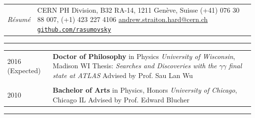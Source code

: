 \documentclass{letter}
\begin{document}
 


\begin{tabular}{p{}p{}}
	\hfill \newline \href{https://ch.linkedin.com/in/andrew-hard-25b690a5}{\Huge{\color{Maroon}{Andrew Hard}}} \newline \LARGE{\textit{R\'{e}sum\'{e}}} \newline
	&
	\hfill \newline CERN PH Division, B32 RA-14, 1211 Gen\`{e}ve, Suisse \newline
	(+41) 076 30 88 007, (+1) 423 227 4106 \newline
	\href{mailto:ahard@cern.ch}{andrew.straiton.hard@cern.ch} \newline
	\href{https://github.com/rasumovsky}{\texttt{github.com/rasumovsky}}\\
\end{tabular}

\begin{flushleft}
\Large{\textsc{\textbf{\color{Maroon}{Education}}}}
\vspace{1pt} %
\hrule
\end{flushleft}

\begin{tabular}{p{}p{}}
	2016 (Expected)
	&
	\textbf{Doctor of Philosophy} in Physics \newline 
	\textit{University of Wisconsin}, Madison WI \newline
	Thesis: \textit{Searches and Discoveries with the $\gamma\gamma$ final state at ATLAS} \newline
	Advised by Prof. Sau Lan Wu \\
\\
	2010 
	& 
	\textbf{Bachelor of Arts} in Physics, Honors \newline 
	\textit{University of Chicago}, Chicago IL \newline
	Advised by Prof. Edward Blucher 
\\
\end{tabular}

\begin{flushleft}
\Large{\textsc{\textbf{\color{Maroon}{Experience}}}}
\vspace{1pt} %
\hrule
\end{flushleft}
\end{document}
